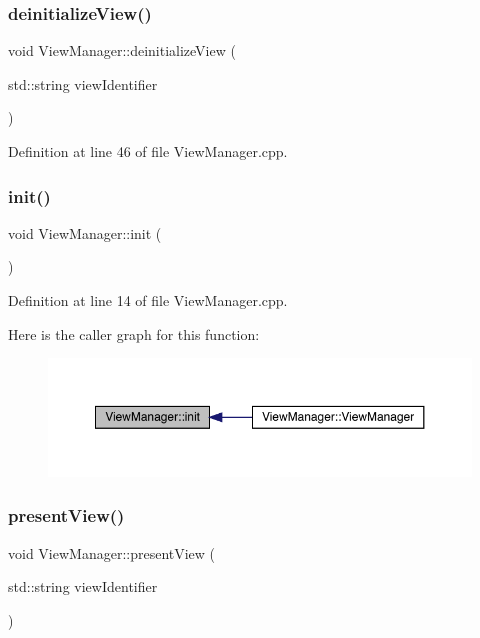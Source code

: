 \subsubsection{\texorpdfstring{deinitialize\+View()}{deinitializeView()}}
{\footnotesize\ttfamily void View\+Manager\+::deinitialize\+View (\begin{DoxyParamCaption}\item[{std\+::string}]{view\+Identifier }\end{DoxyParamCaption})}



Definition at line 46 of file View\+Manager.\+cpp.

\mbox{\label{class_view_manager_aa75748b42456f684282f05100f5b1f60}} 
\subsubsection{\texorpdfstring{init()}{init()}}
{\footnotesize\ttfamily void View\+Manager\+::init (\begin{DoxyParamCaption}{ }\end{DoxyParamCaption})}



Definition at line 14 of file View\+Manager.\+cpp.

Here is the caller graph for this function\+:
\nopagebreak
\begin{figure}[H]
\begin{center}
\leavevmode
\includegraphics[width=350pt]{class_view_manager_aa75748b42456f684282f05100f5b1f60_icgraph}
\end{center}
\end{figure}
\mbox{\label{class_view_manager_a469f00e975467f23e032b66bd7a09567}} 
\subsubsection{\texorpdfstring{present\+View()}{presentView()}}
{\footnotesize\ttfamily void View\+Manager\+::present\+View (\begin{DoxyParamCaption}\item[{std\+::string}]{view\+Identifier }\end{DoxyParamCaption})}



